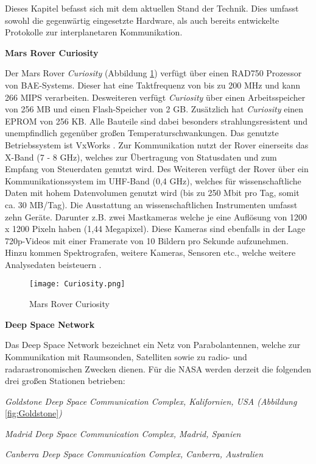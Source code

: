 \label{cap:standDerTechnik}
Dieses Kapitel befasst sich mit dem aktuellen Stand der Technik. Dies
umfasst sowohl die gegenw{\"a}rtig eingesetzte Hardware, als auch bereits
entwickelte Protokolle zur interplanetaren Kommunikation.

\textbf{Mars Rover Curiosity} 

Der Mars Rover \textit{Curiosity} (Abbildung \ref{fig:Curiosity}) verf{\"u}gt
{\"u}ber einen RAD750 Prozessor von BAE-Systems.
Dieser hat eine Taktfrequenz von bis zu 200 MHz und kann 266 MIPS
verarbeiten. Desweiteren verf{\"u}gt \textit{Curiosity} {\"u}ber einen
Arbeitsspeicher von 256 MB und einen Flash-Speicher von 2 GB. Zus{\"a}tzlich hat
\textit{Curiosity} einen EPROM von 256 KB. Alle Bauteile sind dabei besonders
strahlungsresistent und unempfindlich gegen{\"u}ber gro{\ss}en
Temperaturschwankungen. Das genutzte Betriebssystem ist VxWorks \cite{WR}.
Zur Kommunikation nutzt der Rover einerseits das X-Band (7 - 8 GHz), welches zur
{\"U}bertragung von Statusdaten und zum Empfang von Steuerdaten genutzt wird.
Des Weiteren verf{\"u}gt der Rover {\"u}ber ein Kommunikationssystem im UHF-Band
(0,4 GHz), welches f{\"u}r wissenschaftliche Daten mit hohem Datenvolumen
genutzt wird (bis zu 250 Mbit pro Tag, somit ca. 30 MB/Tag). Die Ausstattung an
wissenschaftlichen Instrumenten umfasst zehn Ger{\"a}te. Darunter z.B. zwei
Mastkameras welche je eine Aufl{\"o}sung von 1200 x 1200 Pixeln haben (1,44
Megapixel). Diese Kameras sind ebenfalls in der Lage 720p-Videos mit einer
Framerate von 10 Bildern pro Sekunde aufzunehmen. Hinzu kommen Spektrografen,
weitere Kameras, Sensoren etc., welche weitere Analysedaten beisteuern
\cite{web5}.

\begin{figure}[H]
\centering
\texttt{[image: Curiosity.png]}
\caption[Mars Rover Curiosity]{Mars Rover Curiosity \cite{imgCuriosity}}
\label{fig:Curiosity}
\end{figure}

\textbf{Deep Space Network}

Das Deep Space Network bezeichnet ein Netz von Parabolantennen, welche zur
Kommunikation mit Raumsonden, Satelliten sowie zu radio-
und radarastronomischen Zwecken dienen. F{\"u}r die NASA werden derzeit die
folgenden drei gro{\ss}en Stationen betrieben:

\begin{compactenum}[a)]
\item \textit{Goldstone Deep Space Communication Complex, Kalifornien, USA
(Abbildung} \ref{fig:Goldstone}\textit{)}
\item \textit{Madrid Deep Space Communication Complex, Madrid, Spanien}
\item \textit{Canberra Deep Space Communication Complex, Canberra, Australien}
\end{compactenum}

